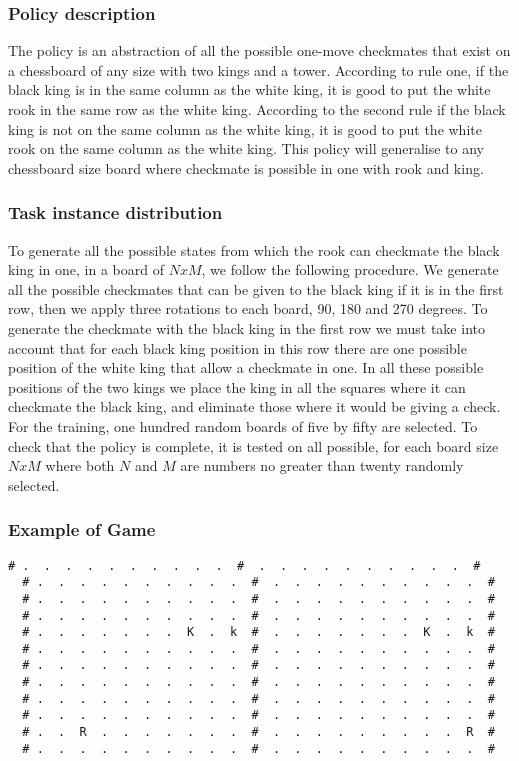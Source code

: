 \documentclass[a4paper]{article}
\begin{document}
\subsubsection{Policy description}
The policy is an abstraction of all the possible one-move checkmates that exist on a chessboard of any size with two kings and a tower. According to rule one, if the black king is in the same column as the white king, it is good to put the white rook in the same row as the white king. According to the second rule if the black king is not on the same column as the white king, it is good to put the white rook on the same column as the white king. This policy will generalise to any chessboard size board where checkmate is possible in one with rook and king.

\subsubsection{Task instance distribution}
To generate all the possible states from which the rook can checkmate the black king in one, in a board of $NxM$, we follow the following procedure. We generate all the possible checkmates that can be given to the black king if it is in the first row, then we apply three rotations to each board, 90, 180 and 270 degrees. To generate the checkmate with the black king in the first row we must take into account that for each black king position in this row there are one possible position of the white king that allow a checkmate in one. In all these possible positions of the two kings we place the king in all the squares where it can checkmate the black king, and eliminate those where it would be giving a check. For the training, one hundred random boards of five by fifty are selected. To check that the policy is complete, it is tested on all possible, for each board size $NxM$ where both $N$ and $M$ are numbers no greater than twenty randomly selected.


\subsubsection{Example of Game}
\begin{Verbatim}[fontsize=\footnotesize]
  # .  .  .  .  .  .  .  .  .  .  #  .  .  .  .  .  .  .  .  .  .  #
  # .  .  .  .  .  .  .  .  .  .  #  .  .  .  .  .  .  .  .  .  .  #
  # .  .  .  .  .  .  .  .  .  .  #  .  .  .  .  .  .  .  .  .  .  #
  # .  .  .  .  .  .  .  .  .  .  #  .  .  .  .  .  .  .  .  .  .  #
  # .  .  .  .  .  .  .  K  .  k  #  .  .  .  .  .  .  .  K  .  k  #
  # .  .  .  .  .  .  .  .  .  .  #  .  .  .  .  .  .  .  .  .  .  #
  # .  .  .  .  .  .  .  .  .  .  #  .  .  .  .  .  .  .  .  .  .  #
  # .  .  .  .  .  .  .  .  .  .  #  .  .  .  .  .  .  .  .  .  .  #
  # .  .  .  .  .  .  .  .  .  .  #  .  .  .  .  .  .  .  .  .  .  #
  # .  .  .  .  .  .  .  .  .  .  #  .  .  .  .  .  .  .  .  .  .  #
  # .  .  R  .  .  .  .  .  .  .  #  .  .  .  .  .  .  .  .  .  R  #
  # .  .  .  .  .  .  .  .  .  .  #  .  .  .  .  .  .  .  .  .  .  #
\end{Verbatim}
\end{document}
